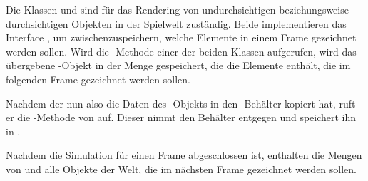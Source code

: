Die Klassen  und  sind für das Rendering von undurchsichtigen beziehungsweise durchsichtigen Objekten in der Spielwelt zuständig. Beide implementieren das Interface , um zwischenzuspeichern, welche Elemente in einem Frame gezeichnet werden sollen. Wird die -Methode einer der beiden Klassen aufgerufen, wird das übergebene -Objekt in der Menge  gespeichert, die die Elemente enthält, die im folgenden Frame gezeichnet werden sollen. 


Nachdem der  nun also die Daten des -Objekts in den -Behälter kopiert hat, ruft er die -Methode von  auf. Dieser nimmt den Behälter entgegen und speichert ihn in .

Nachdem die Simulation für einen Frame abgeschlossen ist, enthalten die  Mengen von  und  alle Objekte der Welt, die im nächsten Frame gezeichnet werden sollen. 

